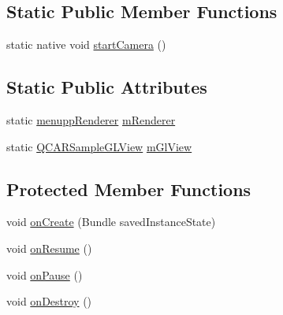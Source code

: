 \subsection*{\-Static \-Public \-Member \-Functions}
\begin{DoxyCompactItemize}
\item 
static native void \hyperlink{classsrdes_1_1menupp_1_1_qcar_engine_ae7585facc847ccbf79b54f96fab55373}{start\-Camera} ()
\end{DoxyCompactItemize}
\subsection*{\-Static \-Public \-Attributes}
\begin{DoxyCompactItemize}
\item 
static \hyperlink{classsrdes_1_1menupp_1_1menupp_renderer}{menupp\-Renderer} \hyperlink{classsrdes_1_1menupp_1_1_qcar_engine_a4fe2bddd0615b29c50a8b0f97883992e}{m\-Renderer}
\item 
static \hyperlink{classsrdes_1_1menupp_1_1_q_c_a_r_sample_g_l_view}{\-Q\-C\-A\-R\-Sample\-G\-L\-View} \hyperlink{classsrdes_1_1menupp_1_1_qcar_engine_a7b80c78913a899d5f2cf6cee037245b9}{m\-Gl\-View}
\end{DoxyCompactItemize}
\subsection*{\-Protected \-Member \-Functions}
\begin{DoxyCompactItemize}
\item 
void \hyperlink{classsrdes_1_1menupp_1_1_qcar_engine_ae231c92b3660c7730e55c2cb729e0c13}{on\-Create} (\-Bundle saved\-Instance\-State)
\item 
void \hyperlink{classsrdes_1_1menupp_1_1_qcar_engine_ae465f4f489c5e22c4a8b25796e6a1ad3}{on\-Resume} ()
\item 
void \hyperlink{classsrdes_1_1menupp_1_1_qcar_engine_a2b4b8bb2a78bfbbe4b78062b0783a9a4}{on\-Pause} ()
\item 
void \hyperlink{classsrdes_1_1menupp_1_1_qcar_engine_a4fa7c792a25953c05d272e0c2fdeb2ef}{on\-Destroy} ()
\end{DoxyCompactItemize}
